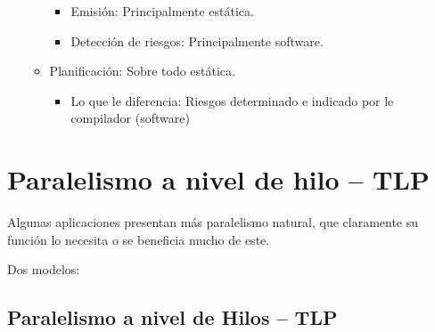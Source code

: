 \documentclass[12pt, twoside, openright]{report} %
\begin{document}
\begin{itemize}
\begin{itemize}
      \begin{itemize}
      
      \item
        Emisión: Principalmente estática.
      \item
        Detección de riesgos: Principalmente software.
      \end{itemize}
    \item
      Planificación: Sobre todo estática.

      \begin{itemize}
      
      \item
        Lo que le diferencia: Riesgos determinado e indicado por le
        compilador (software)
      \end{itemize}
    \end{itemize}
  \end{itemize}

 \section{Paralelismo a nivel de hilo -- TLP}

    Algunas aplicaciones presentan más paralelismo natural, que
    claramente su función lo necesita o se beneficia mucho de este.

    Dos modelos:
\subsection{Paralelismo a nivel de Hilos -- TLP}
\end{document}
